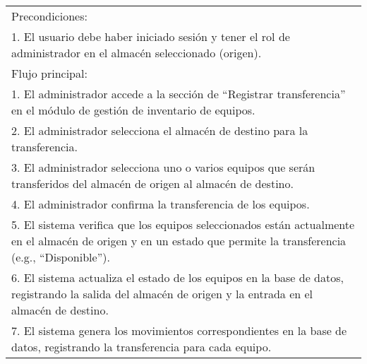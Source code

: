 \documentclass[stu, 12pt, letterpaper, donotrepeattitle, floatsintext, natbib]{apa7}
\begin{document}
\begin{longtable}{@{} p{16.5cm} @{}}
    Precondiciones:                                                                                                                                                                                                                          \\
    1. El usuario debe haber iniciado sesi\'on y tener el rol de administrador en el almac\'en seleccionado (origen).                                                                                                                        \\ \midrule
    Flujo principal:                                                                                                                                                                                                                         \\
    1. El administrador accede a la secci\'on de ``Registrar transferencia'' en el m\'odulo de gesti\'on de inventario de equipos.                                                                                                           \\
    2. El administrador selecciona el almac\'en de destino para la transferencia.                                                                                                                                                            \\
    3. El administrador selecciona uno o varios equipos que ser\'an transferidos del almac\'en de origen al almac\'en de destino.                                                                                                            \\
    4. El administrador confirma la transferencia de los equipos.                                                                                                                                                                            \\
    5. El sistema verifica que los equipos seleccionados est\'an actualmente en el almac\'en de origen y en un estado que permite la transferencia (e.g., ``Disponible'').                                                                   \\
    6. El sistema actualiza el estado de los equipos en la base de datos, registrando la salida del almac\'en de origen y la entrada en el almac\'en de destino.                                                                             \\
    7. El sistema genera los movimientos correspondientes en la base de datos, registrando la transferencia para cada equipo.                                                                                                                \\

\end{longtable}
\end{document}
